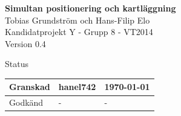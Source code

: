 \documentclass[a4paper,12pt,fleqn]{article}
\begin{document}
	\pagestyle{fancy}
	\vspace*{\fill}
		\begingroup
			\begin{center}
				\huge{\textbf{Simultan positionering och kartläggning}}
				\\
				\vspace{10pt}
				\normalsize
				Tobias Grundström och Hans-Filip Elo
				\\
				Kandidatprojekt Y - Grupp 8 - VT2014
				\\
				Version 0.4
				\end{center}
		\endgroup
	\vspace*{\fill}

	\begin{center} %
		Status
		\\
		\vspace{3pt} %
	    \begin{tabular}{| p{3cm} | p{3cm} | p{3cm} |} %
	    \hline %
	    Granskad & hanel742 & \today \\ \hline %
		Godkänd & - & - \\ \hline %

	    \end{tabular}
	\end{center}
	\vspace{2cm}
	\newpage
\end{document}
